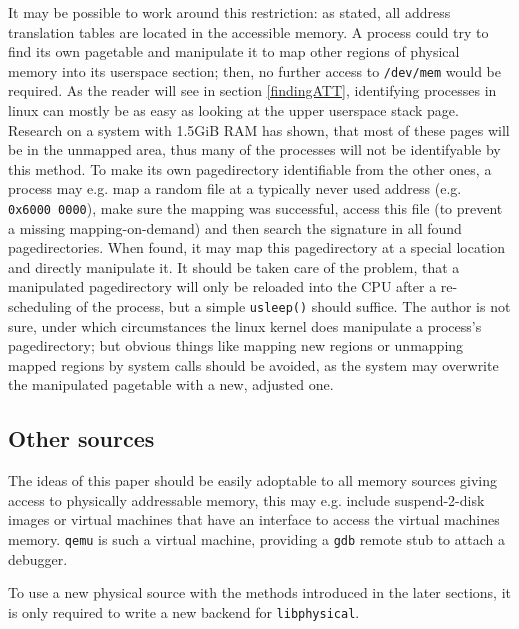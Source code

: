 It may be possible to work around this restriction: as stated, all address
translation tables are located in the accessible memory. A process could try to
find its own pagetable and manipulate it to map other regions of physical memory
into its userspace section; then, no further access to \texttt{/dev/mem} would
be required. As the reader will see in section \ref{findingATT}, identifying
processes in linux can mostly be as easy as looking at the upper userspace stack
page.  Research on a system with 1.5GiB RAM has shown, that most of these pages
will be in the unmapped area, thus many of the processes will not be
identifyable by this method. To make its own pagedirectory identifiable from the
other ones, a process may e.g. map a random file at a typically never used
address (e.g.  \texttt{0x6000~0000}), make sure the mapping was successful,
access this file (to prevent a missing mapping-on-demand) and then search the
signature in all found pagedirectories. When found, it may map this
pagedirectory at a special location and directly manipulate it. It should be
taken care of the problem, that a manipulated pagedirectory will only be
reloaded into the CPU after a re-scheduling of the process, but a simple
\texttt{usleep()} should suffice. The author is not sure, under which
circumstances the linux kernel does manipulate a process's pagedirectory; but
obvious things like mapping new regions or unmapping mapped regions by system
calls should be avoided, as the system may overwrite the manipulated pagetable
with a new, adjusted one.



\subsection{Other sources}

The ideas of this paper should be easily adoptable to all memory sources giving
access to physically addressable memory, this may e.g. include suspend-2-disk
images or virtual machines that have an interface to access the virtual machines
memory.  \texttt{qemu} is such a virtual machine, providing a \texttt{gdb}
remote stub to attach a debugger.

To use a new physical source with the methods introduced in the later sections,
it is only required to write a new backend for \texttt{libphysical}.

